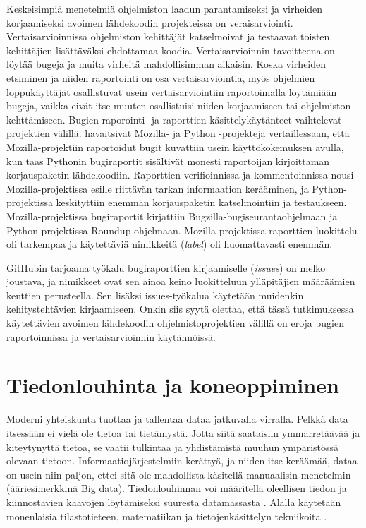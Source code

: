 \documentclass[utf8]{gradu3}
\begin{document}
Keskeisimpiä menetelmiä ohjelmiston laadun parantamiseksi ja virheiden
korjaamiseksi avoimen lähdekoodin projekteissa on veraisarviointi.
Vertaisarvioinnissa ohjelmiston kehittäjät katselmoivat ja testaavat toisten
kehittäjien lisättäväksi ehdottamaa koodia. Vertaisarvioinnin tavoitteena on
löytää bugeja ja muita virheitä mahdollisimman aikaisin. Koska virheiden
etsiminen ja niiden raportointi on osa vertaisarviointia, myös ohjelmien
loppukäyttäjät osallistuvat usein vertaisarviointiin raportoimalla löytämiään
bugeja, vaikka eivät itse muuten osallistuisi niiden korjaamiseen tai
ohjelmiston kehttämiseen. Bugien raporointi- ja raporttien käsittelykäytänteet
vaihtelevat projektien välillä. \textcite{Wang-2015} havaitsivat Mozilla- ja
Python -projekteja vertaillessaan, että Mozilla-projektiin raportoidut bugit
kuvattiin usein käyttökokemuksen avulla, kun taas Pythonin bugiraportit
sisältivät monesti raportoijan kirjoittaman korjauspaketin lähdekoodiin.
Raporttien verifioinnissa ja kommentoinnissa nousi Mozilla-projektissa esille
riittävän tarkan informaation kerääminen, ja Python-projektissa keskityttiin
enemmän korjauspaketin katselmointiin ja testaukseen. Mozilla-projektissa
bugiraportit kirjattiin Bugzilla-bugiseurantaohjelmaan ja Python projektissa
Roundup-ohjelmaan. Mozilla-projektissa raporttien luokittelu oli tarkempaa ja
käytettäviä nimikkeitä (\textit{label}) oli huomattavasti enemmän.
\parencite{Wang-2015} 

GitHubin tarjoama työkalu bugiraporttien kirjaamiselle (\textit{issues}) on
melko joustava, ja nimikkeet ovat sen ainoa keino luokitteluun ylläpitäjien
määräämien kenttien perusteella. Sen lisäksi issues-työkalua käytetään muidenkin
kehitystehtävien kirjaamiseen.  Onkin siis syytä olettaa, että tässä
tutkimuksessa käytettävien avoimen lähdekoodin ohjelmistoprojektien välillä on
eroja bugien raportoinnissa ja vertaisarvioinnin käytännöissä.
  
\chapter{Tiedonlouhinta ja koneoppiminen}

Moderni yhteiskunta tuottaa ja tallentaa dataa jatkuvalla virralla. Pelkkä data
itsessään ei vielä ole tietoa tai tietämystä. Jotta siitä saataisiin
ymmärretäävää ja kiteytynyttä tietoa, se vaatii tulkintaa ja yhdistämistä muuhun
ympäristössä olevaan tietoon. %
Informaatiojärjestelmiin kerättyä, ja niiden itse keräämää, dataa on usein niin
paljon, ettei sitä ole mahdollista käsitellä manuaalisin menetelmin
(ääriesimerkkinä Big data). Tiedonlouhinnan voi määritellä oleellisen tiedon ja
kiinnostavien kaavojen löytämiseksi suuresta datamassasta
\parencite[][8]{han-data_mining}. Alalla käytetään monenlaisia tilastotieteen,
matematiikan ja tietojenkäsittelyn tekniikoita \parencite{clifton-2019}. 
\end{document}
